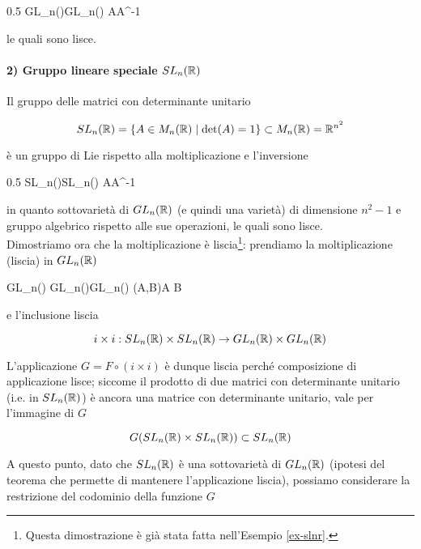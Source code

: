 	{0.5}{%
				{GL_{n}(\R)}{GL_{n}(\R)}
				{A}{A^{-1}}
		}

le quali sono lisce.

\paragraph{2) Gruppo lineare speciale $ SL_{n}(\mathbb{R}) $}

Il gruppo delle matrici con determinante unitario

\begin{equation}
	SL_{n}(\mathbb{R}) = \{ A \in M_{n}(\mathbb{R}) \mid \det(A) = 1 \} \subset M_{n}(\mathbb{R}) = \mathbb{R}^{n^{2}}
\end{equation}

è un gruppo di Lie rispetto alla moltiplicazione e l'inversione

	{0.5}{%
				{SL_{n}(\R)}{SL_{n}(\R)}
				{A}{A^{-1}}
			}

in quanto sottovarietà di $ GL_{n}(\mathbb{R}) $ (e quindi una varietà) di dimensione $ n^{2}-1 $ e gruppo algebrico rispetto alle sue operazioni, le quali sono lisce.\\
Dimostriamo ora che la moltiplicazione è liscia\footnote{%
	Questa dimostrazione è già stata fatta nell'Esempio \ref{ex-slnr}.%
}: prendiamo la moltiplicazione (liscia) in $ GL_{n}(\mathbb{R}) $

	{GL_{n}(\R) \times GL_{n}(\R)}{GL_{n}(\R)}
	{(A,B)}{A B}

e l'inclusione liscia

\begin{equation}
	i \times i : SL_{n}(\mathbb{R}) \times SL_{n}(\mathbb{R}) \to GL_{n}(\mathbb{R}) \times GL_{n}(\mathbb{R})
\end{equation}

L'applicazione $ G = F \circ (i \times i) $ è dunque liscia perché composizione di applicazione lisce; siccome il prodotto di due matrici con determinante unitario (i.e. in $ SL_{n}(\mathbb{R}) $) è ancora una matrice con determinante unitario, vale per l'immagine di $ G $

\begin{equation}
	G(SL_{n}(\mathbb{R}) \times SL_{n}(\mathbb{R})) \subset SL_{n}(\mathbb{R})
\end{equation}

A questo punto, dato che $ SL_{n}(\mathbb{R}) $ è una sottovarietà di $ GL_{n}(\mathbb{R}) $ (ipotesi del teorema che permette di mantenere l'applicazione liscia), possiamo considerare la restrizione del codominio della funzione $ G $

